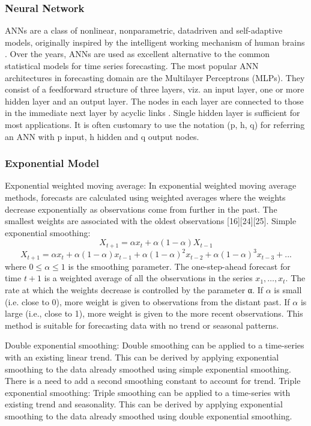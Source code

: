 \subsubsection{Neural Network}
ANNs are a class of nonlinear, nonparametric, datadriven and self-adaptive models, originally inspired by the
intelligent working mechanism of human brains . Over the years, ANNs are used as excellent alternative to the common statistical models for time series forecasting. The most popular ANN architectures in forecasting domain are the Multilayer Perceptrons (MLPs). They consist of a feedforward structure of three layers, viz. an input layer, one or more hidden layer and an output layer. The nodes in each layer are connected to those in the immediate next layer by acyclic links . Single hidden layer is sufficient for most applications. It is often customary to use the notation (p, h, q) for referring an ANN with p input, h hidden and q output nodes.

\subsubsection{Exponential Model}
Exponential weighted moving average: In exponential weighted moving average methods, forecasts are calculated using weighted averages where the weights decrease exponentially as observations come from further in the past. The smallest weights are associated with the oldest observations [16][24][25].
Simple exponential smoothing:
	$$X_{t+1}=\alpha x_t +\alpha(1-\alpha)X_{t-1}$$
	$$X_{t+1}=\alpha x_t +\alpha(1-\alpha)x_{t-1}+\alpha(1-\alpha)^2x_{t-2}+\alpha(1-\alpha)^3x_{t-3}+...$$
where $0\leq \alpha \leq 1$ is the smoothing parameter. The one-step-ahead forecast for time $t+1$ is a weighted average of all the observations in the series $x_1, …, x_t$. The rate at which the weights decrease is controlled by the parameter α. If $\alpha$ is small (i.e. close to 0), more weight is given to observations from the distant past. If $\alpha$ is large (i.e., close to 1), more weight is given to the more recent observations. This method is suitable for forecasting data with no trend or seasonal patterns.

Double exponential smoothing: Double smoothing can be applied to a time-series with an existing linear trend. This can be derived by applying exponential smoothing to the data already smoothed using simple exponential smoothing. There is a need to add a second smoothing constant to account for trend.
Triple exponential smoothing: Triple smoothing can be applied to a time-series with existing trend and seasonality. This can be derived by applying exponential smoothing to the data already smoothed using double exponential smoothing.


